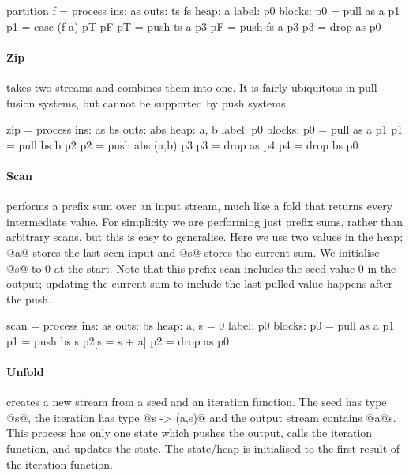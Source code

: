 \begin{code}
partition f = process
     ins: as
    outs: ts fs
    heap: {a}
   label: p0
  blocks: p0 = pull as    a  p1
          p1 = case    (f a) pT pF
          pT = push ts    a  p3
          pF = push fs    a  p3
          p3 = drop as       p0
\end{code}

\paragraph{Zip} takes two streams and combines them into one.
It is fairly ubiquitous in pull fusion systems, but cannot be supported by push systems.

\begin{code}
zip = process
     ins: as bs
    outs: abs
    heap: {a, b}
   label: p0
  blocks: p0 = pull as    a   p1
          p1 = pull bs    b   p2
          p2 = push abs (a,b) p3
          p3 = drop as        p4
          p4 = drop bs        p0
\end{code}

\paragraph{Scan} performs a prefix sum over an input stream, much like a fold that returns every intermediate value.
For simplicity we are performing just prefix sums, rather than arbitrary scans, but this is easy to generalise.
Here we use two values in the heap; @a@ stores the last seen input and @s@ stores the current sum.
We initialise @s@ to 0 at the start.
Note that this prefix scan includes the seed value 0 in the output; updating the current sum to include the last pulled value happens after the push.

\begin{code}
scan = process
     ins: as
    outs: bs
    heap: {a, s = 0}
   label: p0
  blocks: p0 = pull as a  p1
          p1 = push bs s  p2[s = s + a]
          p2 = drop as    p0
\end{code}


\paragraph{Unfold} creates a new stream from a seed and an iteration function.
The seed has type @s@, the iteration has type @s -> (a,s)@ and the output stream contains @a@s.
This process has only one state which pushes the output, calls the iteration function, and updates the state.
The state/heap is initialised to the first result of the iteration function.

